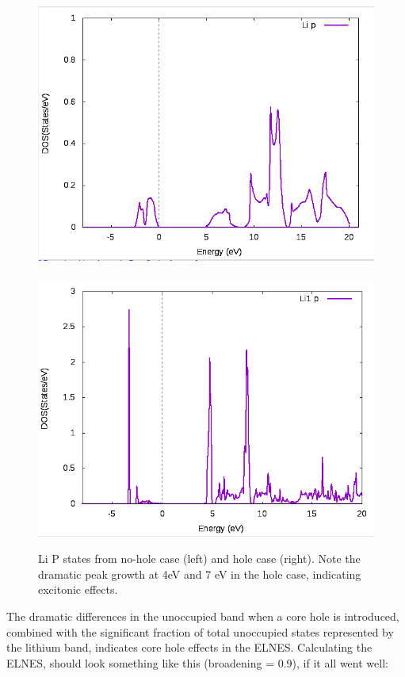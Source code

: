 \documentclass[12pt]{article}
\begin{document}
\begin{figure}[H]
	\includegraphics[scale=0.3]{./images/PDOS_no-hole.png}
	~
	\includegraphics[scale=0.3]{./images/PDOS_hole.png}
	
	\caption{Li P states from no-hole case (left) and hole case (right).  Note the dramatic peak growth at 4eV and 7 eV in the hole case, indicating excitonic effects.}
\end{figure}

 The dramatic differences in the unoccupied band when a core hole is introduced, combined with the significant fraction of total unoccupied states represented by the lithium band, indicates core hole effects in the ELNES.  Calculating the ELNES, should look something like this (broadening = 0.9), if it all went well:  
\end{document}
